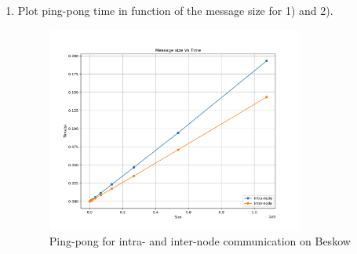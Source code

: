 \documentclass[12pt]{article}
\begin{document}
\begin{enumerate}
\begin{itemize}
    \end{itemize}

    \item Plot ping-pong time in function of the message size for 1) and 2).

    \begin{figure}[H]
    \centering
    \includegraphics[width=0.8\textwidth]{graph-ping-pong.png}
    \caption{Ping-pong for intra- and inter-node communication on Beskow}
    \label{fig:blocking}
  \end{figure}


\end{enumerate}
\end{document}
